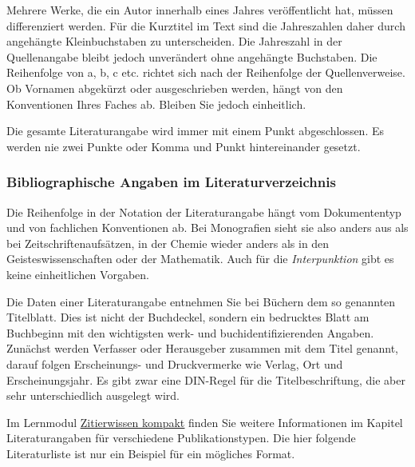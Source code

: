 \documentclass[a4paper,11pt]{article}%
\renewcommand{\\}{\vspace*{0.5\baselineskip} \newline}
\begin{document}
Mehrere Werke, die ein Autor innerhalb eines Jahres veröffentlicht hat, müssen differenziert werden. Für die Kurztitel im Text sind die Jahreszahlen daher durch angehängte Kleinbuchstaben zu unterscheiden. Die Jahreszahl in der Quellenangabe bleibt jedoch unverändert ohne angehängte Buchstaben. Die Reihenfolge von a, b, c etc. richtet sich nach der Reihenfolge der Quellenverweise. Ob Vornamen abgekürzt oder ausgeschrieben werden, hängt von den Konventionen Ihres Faches ab. Bleiben Sie jedoch einheitlich.\\

Die gesamte Literaturangabe wird immer mit einem Punkt abgeschlossen. Es werden nie zwei Punkte oder Komma und Punkt hintereinander gesetzt.



\subsubsection{Bibliographische Angaben im Literaturverzeichnis}

Die Reihenfolge in der Notation der Literaturangabe hängt vom Dokumententyp und von fachlichen Konventionen ab. Bei Monografien sieht sie also anders aus als bei Zeitschriftenaufsätzen, in der Chemie wieder anders als in den Geisteswissenschaften oder der Mathematik. Auch für die \textit{Interpunktion} gibt es keine einheitlichen Vorgaben.\\ 

Die Daten einer Literaturangabe entnehmen Sie bei Büchern dem so genannten Titelblatt. Dies ist nicht der Buchdeckel, sondern ein bedrucktes Blatt am Buchbeginn mit den wichtigsten werk- und buchidentifizierenden Angaben. Zunächst werden Verfasser oder Herausgeber zusammen mit dem Titel genannt, darauf folgen Erscheinungs- und Druckvermerke wie Verlag, Ort und Erscheinungsjahr. Es gibt zwar eine DIN-Regel für die Titelbeschriftung, die aber sehr unterschiedlich ausgelegt wird.\\

Im Lernmodul \href{https://ilias.th-koeln.de/ilias.php?baseClass=ilRepositoryGUI}{\underline{Zitierwissen kompakt}} finden Sie weitere Informationen im Kapitel Literaturangaben für verschiedene Publikationstypen. Die hier folgende Literaturliste ist nur ein Beispiel für ein mögliches Format.

\newpage
\end{document}
